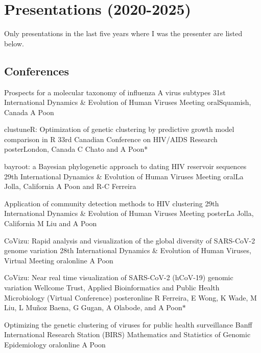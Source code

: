 
\section {Presentations (2020-2025)}

Only presentations in the last five years where I was the presenter are listed below.

\subsection {Conferences}


{Prospects for a molecular taxonomy of influenza A virus subtypes}
{31st International Dynamics \& Evolution of Human Viruses Meeting}
{oral}{Squamish, Canada}
{A Poon}




{clustuneR: Optimization of genetic clustering by predictive growth model comparison in R}
{33rd Canadian Conference on HIV/AIDS Research}
{poster}{London, Canada}
{C Chato and A Poon*}



{bayroot: a Bayesian phylogenetic approach to dating HIV reservoir sequences}
{29th International Dynamics \& Evolution of Human Viruses Meeting}
{oral}{La Jolla, California}
{A Poon and R-C Ferreira}{}


{Application of community detection methods to HIV clustering}
{29th International Dynamics \& Evolution of Human Viruses Meeting}
{poster}{La Jolla, California}
{M Liu and A Poon}{}



{CoVizu: Rapid analysis and visualization of the global diversity of SARS-CoV-2 genome variation}
{28th International Dynamics \& Evolution of Human Viruses, Virtual Meeting}
{oral}{online}
{A Poon}{}

{CoVizu: Near real time visualization of SARS-CoV-2 (hCoV-19) genomic variation}
{Wellcome Trust, Applied Bioinformatics and Public Health Microbiology (Virtual Conference)}
{poster}{online}
{R Ferreira, E Wong, K Wade, M Liu, L Mu\~noz Baena, G Gugan, A Olabode, and A Poon$\ast$}{}

{Optimizing the genetic clustering of viruses for public health surveillance}
{Banff International Research Station (BIRS) Mathematics and Statistics of Genomic Epidemiology}
{oral}{online}
{A Poon}{}

